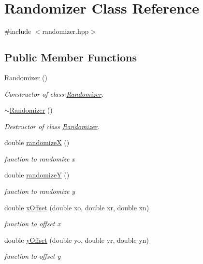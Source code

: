 \hypertarget{class_randomizer}{}\section{Randomizer Class Reference}
\label{class_randomizer}


{\ttfamily \#include $<$randomizer.\+hpp$>$}

\subsection*{Public Member Functions}
\begin{DoxyCompactItemize}
\item 
\hyperlink{class_randomizer_a6f1e3b306ed5d631a73990c757e777c6}{Randomizer} ()
\begin{DoxyCompactList}\small\item\em Constructor of class \hyperlink{class_randomizer}{Randomizer}. \end{DoxyCompactList}\item 
\hyperlink{class_randomizer_a33bacd33bccd73fa894cfb8405bb1591}{$\sim$\+Randomizer} ()
\begin{DoxyCompactList}\small\item\em Destructor of class \hyperlink{class_randomizer}{Randomizer}. \end{DoxyCompactList}\item 
double \hyperlink{class_randomizer_a058604a7e58e05e0b5082a865601f98c}{randomizeX} ()
\begin{DoxyCompactList}\small\item\em function to randomize x \end{DoxyCompactList}\item 
double \hyperlink{class_randomizer_a8118622933e6fb5a7a9120e6247abe4c}{randomizeY} ()
\begin{DoxyCompactList}\small\item\em function to randomize y \end{DoxyCompactList}\item 
double \hyperlink{class_randomizer_a7bbb208529d0c02e4a5aa7510f69a7b7}{x\+Offset} (double xo, double xr, double xn)
\begin{DoxyCompactList}\small\item\em function to offset x \end{DoxyCompactList}\item 
double \hyperlink{class_randomizer_a47b692837880d2840cbc92b79a5a0de3}{y\+Offset} (double yo, double yr, double yn)
\begin{DoxyCompactList}\small\item\em function to offset y \end{DoxyCompactList}\end{DoxyCompactItemize}
